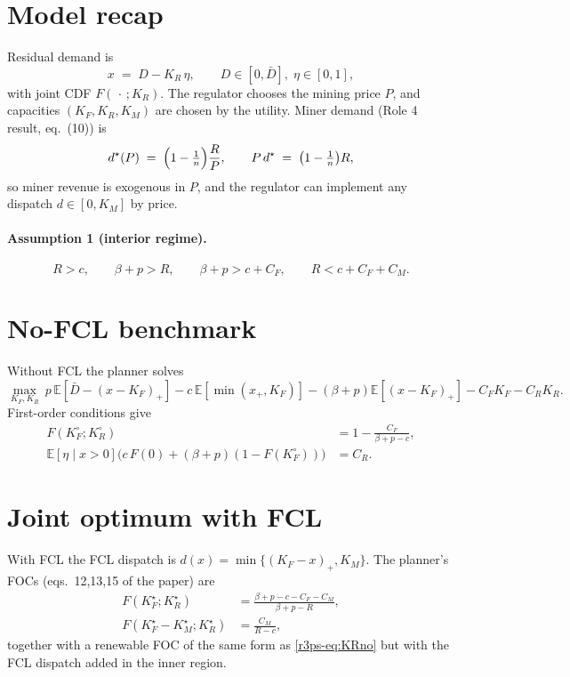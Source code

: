\section{Model recap}
Residual demand is
\[
x \;=\; D - K_R\,\eta, \qquad D\in[0,\bar D],\; \eta\in[0,1],
\]
with joint CDF $F(\,\cdot\,;K_R)$. The regulator chooses the mining price $P$, and capacities $(K_F,K_R,K_M)$ are chosen by the utility. Miner demand (Role 4 result, eq.~(10)) is
\begin{equation}
d^{\star}(P) \;=\; \Bigl(1-\tfrac{1}{n}\Bigr)\frac{R}{P},
\qquad P\,d^{\star} \;=\; \bigl(1-\tfrac{1}{n}\bigr)R,
\label{r3ps-eq:miner}
\end{equation}
so miner revenue is exogenous in $P$, and the regulator can implement any dispatch $d\in[0,K_M]$ by price.

\paragraph{Assumption 1 (interior regime).}
\[
R>c,\qquad \beta+p>R,\qquad \beta+p>c+C_F,\qquad R<c+C_F+C_M.
\]

\section{No-FCL benchmark}
Without FCL the planner solves
\[
\max_{K_F,K_R}\ p\,\mathbb E[\bar D-(x-K_F)_+]
-c\,\mathbb E[\min(x_+,K_F)]
-(\beta+p)\mathbb E[(x-K_F)_+]
-C_F K_F-C_R K_R.
\]
First-order conditions give
\begin{align}
F(K_F^{\circ};K_R^{\circ}) &= 1-\frac{C_F}{\beta+p-c}, \label{r3ps-eq:KFno}\\
\mathbb E[\eta\mid x>0]\bigl(c\,F(0)+(\beta+p)(1-F(K_F^{\circ}))\bigr) &=C_R. \label{r3ps-eq:KRno}
\end{align}

\section{Joint optimum with FCL}
With FCL the FCL dispatch is $d(x)=\min\{(K_F-x)_+,K_M\}$. The planner's FOCs (eqs.~12,13,15 of the paper) are
\begin{align}
F(K_F^{\star};K_R^{\star}) &= \frac{\beta+p-c-C_F-C_M}{\beta+p-R}, \label{r3ps-eq:KF}\\
F(K_F^{\star}-K_M^{\star};K_R^{\star}) &= \frac{C_M}{R-c}, \label{r3ps-eq:KM}
\end{align}
together with a renewable FOC of the same form as \eqref{r3ps-eq:KRno} but with the FCL dispatch added in the inner region.

